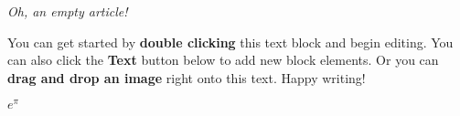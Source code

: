 \textit{Oh, an empty article!} 

You can get started by \textbf{double clicking} this text block and
begin editing. You can also click the \textbf{Text} button below to
add new block elements. Or you can \textbf{drag and drop an image}
right onto this text. Happy writing!

$e^\pi$